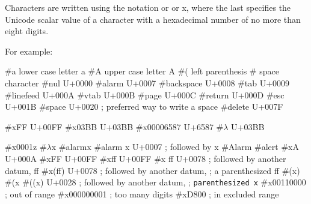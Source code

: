 Characters are written using the notation
\sharpsign\backwhack{} or
\sharpsign\backwhack{} or
\sharpsign\backwhack{}x, where the last
specifies the Unicode scalar value of a character with a hexadecimal number of
no more than eight digits.

For example:

\begin{schemenoindent}
\#\backwhack{}a          \ev \textrm{lower case letter a}
\#\backwhack{}A          \ev \textrm{upper case letter A}
\#\backwhack{}(          \ev \textrm{left parenthesis}
\#\backwhack{}           \ev \textrm{space character}
\#\backwhack{}nul        \ev \textrm{U+0000}
\#\backwhack{}alarm      \ev \textrm{U+0007}
\#\backwhack{}backspace  \ev \textrm{U+0008}
\#\backwhack{}tab        \ev \textrm{U+0009}
\#\backwhack{}linefeed   \ev \textrm{U+000A}
\#\backwhack{}vtab       \ev \textrm{U+000B}
\#\backwhack{}page       \ev \textrm{U+000C}
\#\backwhack{}return     \ev \textrm{U+000D}
\#\backwhack{}esc        \ev \textrm{U+001B}
\#\backwhack{}space      \ev \textrm{U+0020}
\>\>; \textrm{preferred way to write a space}
\#\backwhack{}delete     \ev \textrm{U+007F}

\#\backwhack{}xFF        \ev \textrm{U+00FF}
\#\backwhack{}x03BB      \ev \textrm{U+03BB}
\#\backwhack{}x00006587  \ev \textrm{U+6587}
\#\backwhack{}\(\lambda\) \ev \textrm{U+03BB}

\#\backwhack{}x0001z     \ev {}
\#\backwhack{}\(\lambda\)x         \ev {}
\#\backwhack{}alarmx     \ev {}
\#\backwhack{}alarm x    \ev \textrm{U+0007}
\>\>; \textrm{followed by {\cf x}}
\#\backwhack{}Alarm      \ev {}
\#\backwhack{}alert      \ev {}
\#\backwhack{}xA         \ev \textrm{U+000A}
\#\backwhack{}xFF        \ev \textrm{U+00FF}
\#\backwhack{}xff        \ev \textrm{U+00FF}
\#\backwhack{}x ff       \ev \textrm{U+0078}
\>\>; \textrm{followed by another datum, {\cf ff}}
\#\backwhack{}x(ff)      \ev \textrm{U+0078}
\>\>; \textrm{followed by another datum,}
\>\>; \textrm{a parenthesized {\cf ff}}
\#\backwhack{}(x)        \ev {}
\#\backwhack{}(x         \ev {}
\#\backwhack{}((x)       \ev \textrm{U+0028}
\>\>; \textrm{followed by another datum,}
\>\>; \texttt{parenthesized {\cf x}}
\#\backwhack{}x00110000  \ev {}
\>\>; \textrm{out of range}
\#\backwhack{}x000000001 \ev {}
\>\>; \textrm{too many digits}  
\#\backwhack{}xD800      \ev {}
\>\>; \textrm{in excluded range}
\end{schemenoindent}

